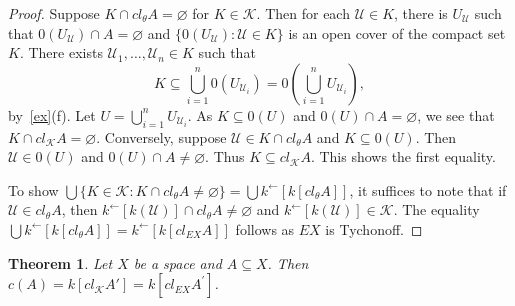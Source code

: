 \documentclass[11pt]{amsart}
\newif\ifdraft\draftfalse
\newtheorem{theorem}{Theorem}[section]
\theoremstyle{definition}
\theoremstyle{remark}
\numberwithin{equation}{section}
\begin{document}
\begin{proof}
Suppose $K{\cap} cl_\theta A={\varnothing}$ for $K\in{\ensuremath{\mathcal{{K}}}}$. Then for each ${\ensuremath{\mathcal{{U}}}}\in K$, there is $U_{\ensuremath{\mathcal{{U}}}}$ such that $0(U_{\ensuremath{\mathcal{{U}}}}){\cap} A={\varnothing}$ and $\{0(U_{\ensuremath{\mathcal{{U}}}}):{\ensuremath{\mathcal{{U}}}}\in K\}$ is an open cover of the compact set $K$. There exists ${\ensuremath{\mathcal{{U}}}}_1,\ldots,{\ensuremath{\mathcal{{U}}}}_n\in K$ such that 
$$K{\subseteq}{\bigcup}_{i=1}^n 0(U_{{\ensuremath{\mathcal{{U}}}}_i})=0({\bigcup}_{i=1}^nU_{{\ensuremath{\mathcal{{U}}}}_i}),$$
by~\ref{ex}(f). Let $U={\bigcup}_{i=1}^nU_{{\ensuremath{\mathcal{{U}}}}_i}$. As $K \subseteq 0(U)$ and $0(U) \cap A = \varnothing$, we see that $K \cap cl_{{\ensuremath{\mathcal{K}}}}A = \varnothing$. Conversely, suppose ${\ensuremath{\mathcal{{U}}}}\in K{\cap} cl_\theta A$ and $K{\subseteq} 0(U)$. Then ${\ensuremath{\mathcal{{U}}}}\in 0(U)$ and $0(U){\cap} A\neq{\varnothing}$. Thus $K{\subseteq} cl_{\ensuremath{\mathcal{{K}}}}A$. This shows the first equality.

To show ${\bigcup}\{K\in{\ensuremath{\mathcal{{K}}}}:K{\cap} cl_\theta A\neq{\varnothing}\}={\bigcup} k^{\leftarrow}[k[cl_\theta A]]$, it suffices to note that if ${\ensuremath{\mathcal{{U}}}}\in cl_\theta A$, then $k^{\leftarrow}[k({\ensuremath{\mathcal{{U}}}})]{\cap} cl_\theta A\neq{\varnothing}$ and $k^\leftarrow[k({\ensuremath{\mathcal{{U}}}})]\in{\ensuremath{\mathcal{{K}}}}$. The equality ${\bigcup} k^{\leftarrow}[k[cl_\theta A]]=k^{\leftarrow}[k[cl_{EX}A]]$ follows as $EX$ is Tychonoff.
\end{proof}

\begin{theorem}{{\immediate{}}{\ifdraft\hspace{-\lastskip}\vadjust{\vspace{-1mm}\smash{\llap{{\tt {{EXchar}}}\hspace{8mm}}}\vspace{1mm}}\fi}}
Let $X$ be a space and $A \subseteq X$.  Then $c(A) = k[cl_{{\ensuremath{\mathcal{K}}}}A']=k[cl_{EX}A^\prime]$.
\end{theorem}
\end{document}
